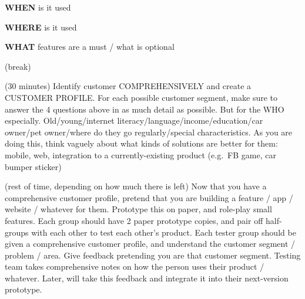 \textbf{WHEN} is it used

\textbf{WHERE} is it used

\textbf{WHAT} features are a must / what is optional

(break)

(30 minutes) Identify customer COMPREHENSIVELY and create a CUSTOMER
PROFILE. For each possible customer segment, make sure to answer the 4
questions above in as much detail as possible. But for the WHO
especially. Old/young/internet literacy/language/income/education/car
owner/pet owner/where do they go regularly/special characteristics. As
you are doing this, think vaguely about what kinds of solutions are
better for them: mobile, web, integration to a currently-existing
product (e.g.~FB game, car bumper sticker)

(rest of time, depending on how much there is left) Now that you have a
comprehensive customer profile, pretend that you are building a feature
/ app / website / whatever for them. Prototype this on paper, and
role-play small features. Each group should have 2 paper prototype
copies, and pair off half-groups with each other to test each other's
product. Each tester group should be given a comprehensive customer
profile, and understand the customer segment / problem / area. Give
feedback pretending you are that customer segment. Testing team takes
comprehensive notes on how the person uses their product / whatever.
Later, will take this feedback and integrate it into their next-version
prototype.
